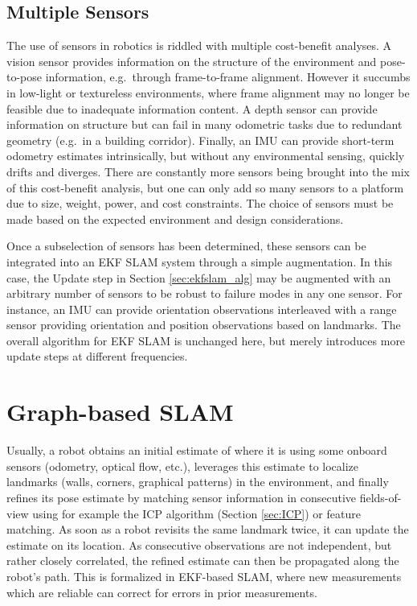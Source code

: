 \subsection{Multiple Sensors}
The use of sensors in robotics is riddled with multiple cost-benefit analyses. A vision sensor provides information on the structure of the environment and pose-to-pose information, e.g.\ through frame-to-frame alignment. However it succumbs in low-light or textureless environments, where frame alignment may no longer be feasible due to inadequate information content. A depth sensor can provide information on structure but can fail in many odometric tasks due to redundant geometry (e.g.\ in a building corridor). Finally, an IMU can provide short-term odometry estimates intrinsically, but without any environmental sensing, quickly drifts and diverges. There are constantly more sensors being brought into the mix of this cost-benefit analysis, but one can only add so many sensors to a platform due to size, weight, power, and cost constraints. The choice of sensors must be made based on the expected environment and design considerations.

Once a subselection of sensors has been determined, these sensors can be integrated into an EKF SLAM system through a simple augmentation. In this case, the Update step in Section \ref{sec:ekfslam_alg} may be augmented with an arbitrary number of sensors to be robust to failure modes in any one sensor. For instance, an IMU can provide orientation observations interleaved with a range sensor providing orientation and position observations based on landmarks. The overall algorithm for EKF SLAM is unchanged here, but merely introduces more update steps at different frequencies.

\section{Graph-based SLAM}
Usually, a robot obtains an initial estimate of where it is using some onboard sensors (odometry, optical flow, etc.), leverages this estimate to localize landmarks (walls, corners, graphical patterns) in the environment, and finally refines its pose estimate by matching sensor information in consecutive fields-of-view using for example the ICP algorithm (Section \ref{sec:ICP}) or feature matching. As soon as a robot revisits the same landmark twice, it can update the estimate on its location. As consecutive observations are not independent, but rather closely correlated, the refined estimate can then be propagated along the robot's path. This is formalized in EKF-based SLAM, where new measurements which are reliable can correct for errors in prior measurements.

